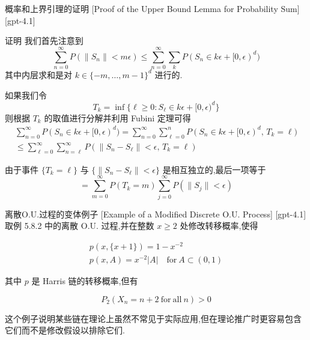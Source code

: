 \documentclass[UTF8]{ctexart}
\begin{document}
    
    
    \begin{prf}
        {概率和上界引理的证明}
        [Proof of the Upper Bound Lemma for Probability Sum]
        [gpt-4.1]
        
证明 我们首先注意到
\[
\sum_{n=0}^{\infty} P(\|S_{n}\| < m\epsilon) \leq \sum_{n=0}^{\infty} \sum_{k} P(S_{n} \in k\epsilon + [0,\epsilon)^{d})
\]
其中内层求和是对 $k \in \{-m, \ldots, m-1\}^{d}$ 进行的.

如果我们令
\[
T_{k} = \inf\{\ell \geq 0 : S_{\ell} \in k\epsilon + [0,\epsilon)^{d}\}
\]
则根据 $T_{k}$ 的取值进行分解并利用 Fubini 定理可得
\[
\begin{array}{r}
\displaystyle\sum_{n=0}^{\infty} P(S_{n} \in k\epsilon + [0,\epsilon)^{d}) = \displaystyle\sum_{n=0}^{\infty} \sum_{\ell=0}^{n} P(S_{n} \in k\epsilon + [0,\epsilon)^{d},\, T_{k} = \ell) \\
\displaystyle\le \sum_{\ell=0}^{\infty} \sum_{n=\ell}^{\infty} P(\|S_{n} - S_{\ell}\| < \epsilon,\, T_{k} = \ell)
\end{array}
\]

由于事件 $\{T_{k} = \ell\}$ 与 $\{\|S_{n} - S_{\ell}\| < \epsilon\}$ 是相互独立的,最后一项等于
\[
= \sum_{m=0}^{\infty} P(T_{k} = m) \sum_{j=0}^{\infty} P(\|S_{j}\| < \epsilon)
\]

    \end{prf}
    
    
    
    \begin{xmp}
        {离散O.U.过程的变体例子}
        [Example of a Modified Discrete O.U. Process]
        [gpt-4.1]
        取例 5.8.2 中的离散 O.U. 过程,并在整数 $x \geq 2$ 处修改转移概率,使得

\[
\begin{array}{l}
p(x, \{x+1\}) = 1 - x^{-2} \\
p(x, A) = x^{-2} |A| \quad \mathrm{for}\ A \subset (0, 1)
\end{array}
\]

其中 $p$ 是 Harris 链的转移概率,但有

\[
P_2(X_n = n+2\ \mathrm{for\ all}\ n) > 0
\]

这个例子说明某些链在理论上虽然不常见于实际应用,但在理论推广时更容易包含它们而不是修改假设以排除它们.
    \end{xmp}
    
    
    
\end{document}
